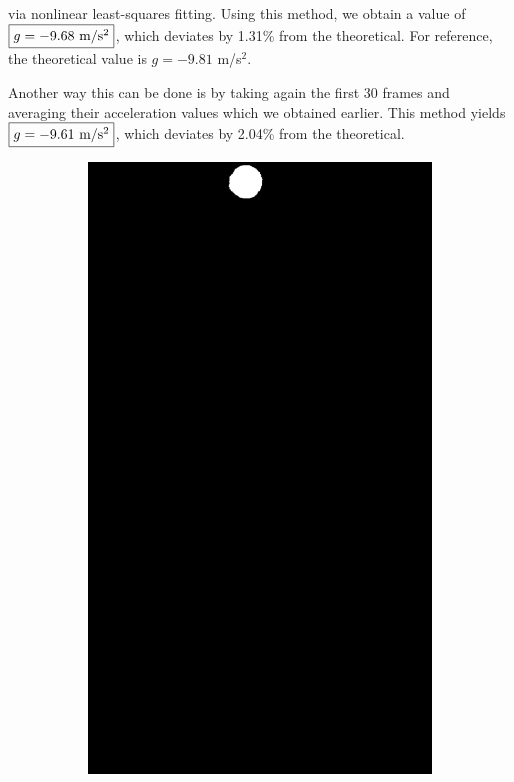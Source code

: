 \documentclass[12pt,a4paper]{article}
\begin{document}
\noindent
via nonlinear least-squares fitting. Using this method, we obtain a value of $\boxed{g = -9.68$ m/s$^2}$, which deviates by 1.31\% from the theoretical. For reference, the theoretical value is $g = -9.81$ m/s$^2$.

Another way this can be done is by taking again the first 30 frames and averaging their acceleration values which we obtained earlier. This method yields $\boxed{g = -9.61$ m/s$^2}$, which deviates by 2.04\% from the theoretical.

\begin{figure}[htb]
	\centering
	\begin{subfigure}[h!]{0.3\textwidth}
		\centering
		\includegraphics[width=\textwidth]{7296/0.png}

\end{subfigure}
\end{figure}
\end{document}
